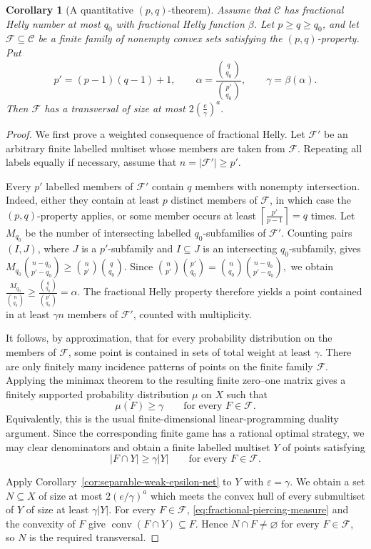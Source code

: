 \documentclass[10pt,a4paper]{amsart}
\newtheorem{cor}{Corollary}
\newcommand{\C}{\mathcal{C}}
\newcommand{\F}{\mathcal{F}}
\newcommand{\conv}{\operatorname{conv}}
\begin{document}
\begin{cor}[A quantitative $(p,q)$-theorem]
\label{cor:separable-pq}
Assume that $\C$ has fractional Helly number at most $q_0$ with
fractional Helly function $\beta$.  Let $p\ge q\ge q_0$, and let
$\F\subseteq\C$ be a finite family of nonempty convex sets satisfying
the $(p,q)$-property.  Put
\[
p'=(p-1)(q-1)+1,
\qquad
\alpha=\frac{\binom q{q_0}}{\binom{p'}{q_0}},
\qquad
\gamma=\beta(\alpha).
\]
Then $\F$ has a transversal of size at most
$2\left(\frac e\gamma\right)^a.$
\end{cor}

\begin{proof}
We first prove a weighted consequence of fractional Helly.  Let
$\F'$ be an arbitrary finite labelled multiset whose members are
taken from $\F$.  Repeating all labels equally if necessary, assume
that $n=|\F'|\ge p'$.

Every $p'$ labelled members of $\F'$ contain $q$ members with
nonempty intersection.  Indeed, either they contain at least $p$
distinct members of $\F$, in which case the $(p,q)$-property applies,
or some member occurs at least
$\left\lceil\frac{p'}{p-1}\right\rceil=q$
times.  Let $M_{q_0}$ be the number of intersecting labelled
$q_0$-subfamilies of $\F'$.  Counting pairs $(I,J)$, where $J$ is a
$p'$-subfamily and $I\subseteq J$ is an intersecting
$q_0$-subfamily, gives
$M_{q_0}\binom{n-q_0}{p'-q_0}
\ge
\binom n{p'}\binom q{q_0}.$
Since
$\binom n{p'}\binom{p'}{q_0}
=
\binom n{q_0}\binom{n-q_0}{p'-q_0},$
we obtain
$\frac{M_{q_0}}{\binom n{q_0}}
\ge
\frac{\binom q{q_0}}{\binom{p'}{q_0}}
=
\alpha.$
The fractional Helly property therefore yields a point contained in
at least $\gamma n$ members of $\F'$, counted with multiplicity.

It follows, by approximation, that for every probability distribution
on the members of $\F$, some point is contained in sets of total
weight at least $\gamma$.  There are only finitely many incidence
patterns of points on the finite family $\F$.  Applying the minimax
theorem to the resulting finite zero--one matrix gives a finitely
supported probability distribution $\mu$ on $X$ such that
\[
\mu(F)\ge\gamma
\qquad\text{for every }F\in\F.
\]
Equivalently, this is the usual finite-dimensional linear-programming
duality argument.  Since the corresponding finite game has a rational
optimal strategy, we may clear denominators and obtain a finite
labelled multiset $Y$ of points satisfying
\begin{equation}\label{eq:fractional-piercing-measure}
|F\cap Y|\ge\gamma|Y|
\qquad\text{for every }F\in\F.
\end{equation}

Apply Corollary~\ref{cor:separable-weak-epsilon-net} to $Y$ with
$\varepsilon=\gamma$.  We obtain a set $N\subseteq X$ of size at most
$2(e/\gamma)^a$ which meets the convex hull of every submultiset of
$Y$ of size at least $\gamma|Y|$.  For every $F\in\F$,
\eqref{eq:fractional-piercing-measure} and the convexity of $F$ give
$\conv(F\cap Y)\subseteq F.$
Hence $N\cap F\ne\varnothing$ for every $F\in\F$, so $N$ is the
required transversal.
\end{proof}
\end{document}
